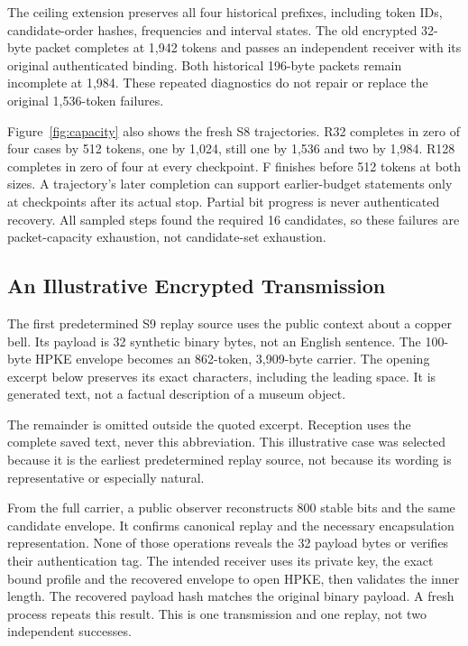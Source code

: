 \documentclass[a4paper,twoside]{article}
\begin{document}
The ceiling extension preserves all four historical prefixes, including token IDs, candidate-order hashes, frequencies and interval states. The old encrypted 32-byte packet completes at 1,942 tokens and passes an independent receiver with its original authenticated binding. Both historical 196-byte packets remain incomplete at 1,984. These repeated diagnostics do not repair or replace the original 1,536-token failures.

Figure~\ref{fig:capacity} also shows the fresh S8 trajectories. R32 completes in zero of four cases by 512 tokens, one by 1,024, still one by 1,536 and two by 1,984. R128 completes in zero of four at every checkpoint. F finishes before 512 tokens at both sizes. A trajectory's later completion can support earlier-budget statements only at checkpoints after its actual stop. Partial bit progress is never authenticated recovery. All sampled steps found the required 16 candidates, so these failures are packet-capacity exhaustion, not candidate-set exhaustion.

\subsection{An Illustrative Encrypted Transmission}
\noindent The first predetermined S9 replay source uses the public context about a copper bell. Its payload is 32 synthetic binary bytes, not an English sentence. The 100-byte HPKE envelope becomes an 862-token, 3,909-byte carrier. The opening excerpt below preserves its exact characters, including the leading space. It is generated text, not a factual description of a museum object.
\begin{quote}
\end{quote}
The remainder is omitted outside the quoted excerpt. Reception uses the complete saved text, never this abbreviation. This illustrative case was selected because it is the earliest predetermined replay source, not because its wording is representative or especially natural.

From the full carrier, a public observer reconstructs 800 stable bits and the same candidate envelope. It confirms canonical replay and the necessary encapsulation representation. None of those operations reveals the 32 payload bytes or verifies their authentication tag. The intended receiver uses its private key, the exact bound profile and the recovered envelope to open HPKE, then validates the inner length. The recovered payload hash matches the original binary payload. A fresh process repeats this result. This is one transmission and one replay, not two independent successes.
\end{document}
